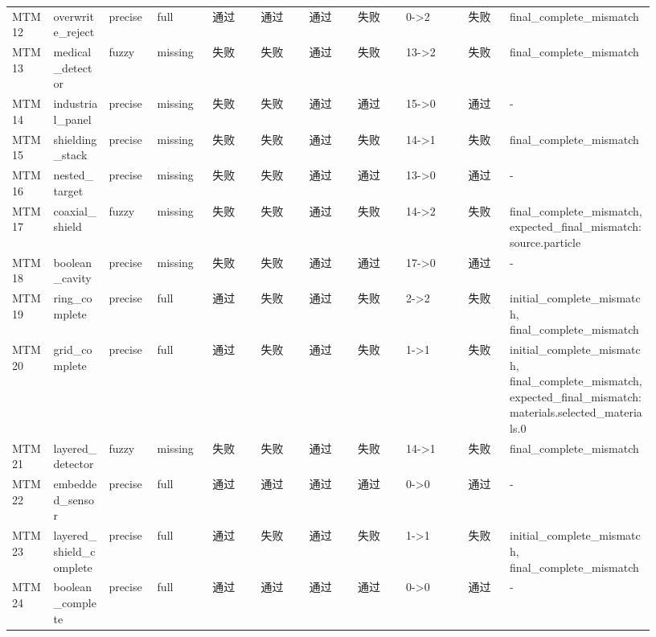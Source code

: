 \documentclass[11pt]{ctexart}
\begin{document}
\begin{longtable}{p{0.06\linewidth}p{0.08\linewidth}p{0.07\linewidth}p{0.08\linewidth}p{0.07\linewidth}p{0.07\linewidth}p{0.07\linewidth}p{0.07\linewidth}p{0.09\linewidth}p{0.06\linewidth}p{0.21\linewidth}}
MTM12 & overwrite\_reject & precise & full & 通过 & 通过 & 通过 & 失败 & 0->2 & 失败 & final\_complete\_mismatch \\
MTM13 & medical\_detector & fuzzy & missing & 失败 & 失败 & 通过 & 失败 & 13->2 & 失败 & final\_complete\_mismatch \\
MTM14 & industrial\_panel & precise & missing & 失败 & 失败 & 通过 & 通过 & 15->0 & 通过 & - \\
MTM15 & shielding\_stack & precise & missing & 失败 & 失败 & 通过 & 失败 & 14->1 & 失败 & final\_complete\_mismatch \\
MTM16 & nested\_target & precise & missing & 失败 & 失败 & 通过 & 通过 & 13->0 & 通过 & - \\
MTM17 & coaxial\_shield & fuzzy & missing & 失败 & 失败 & 通过 & 失败 & 14->2 & 失败 & final\_complete\_mismatch, expected\_final\_mismatch:source.particle \\
MTM18 & boolean\_cavity & precise & missing & 失败 & 失败 & 通过 & 通过 & 17->0 & 通过 & - \\
MTM19 & ring\_complete & precise & full & 通过 & 失败 & 通过 & 失败 & 2->2 & 失败 & initial\_complete\_mismatch, final\_complete\_mismatch \\
MTM20 & grid\_complete & precise & full & 通过 & 失败 & 通过 & 失败 & 1->1 & 失败 & initial\_complete\_mismatch, final\_complete\_mismatch, expected\_final\_mismatch:materials.selected\_materials.0 \\
MTM21 & layered\_detector & fuzzy & missing & 失败 & 失败 & 通过 & 失败 & 14->1 & 失败 & final\_complete\_mismatch \\
MTM22 & embedded\_sensor & precise & full & 通过 & 通过 & 通过 & 通过 & 0->0 & 通过 & - \\
MTM23 & layered\_shield\_complete & precise & full & 通过 & 失败 & 通过 & 失败 & 1->1 & 失败 & initial\_complete\_mismatch, final\_complete\_mismatch \\
MTM24 & boolean\_complete & precise & full & 通过 & 通过 & 通过 & 通过 & 0->0 & 通过 & - \\
\bottomrule
\end{longtable}
\end{document}

